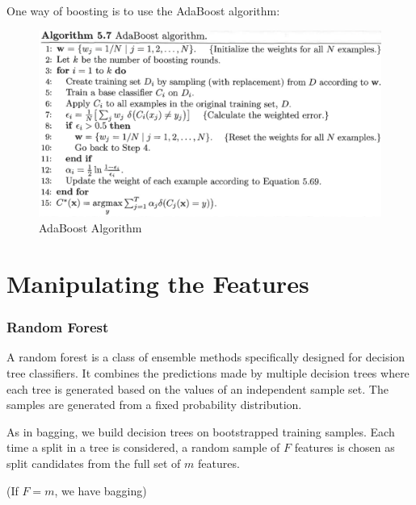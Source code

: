 One way of boosting is to use the AdaBoost algorithm:

\begin{figure}[H]
    \centering
    \includegraphics[scale=0.3]{figures/adaboost.png}
    \caption{AdaBoost Algorithm}
\end{figure}

\newpage
\section{Manipulating the Features}
\subsubsection{Random Forest}
A random forest is a class of ensemble methods specifically designed for decision tree classifiers.
It combines the predictions made by multiple decision trees where each tree is generated based on the values of an independent sample set.
The samples are generated from a fixed probability distribution.

\bigskip
As in bagging, we build decision trees on bootstrapped training samples.
Each time a split in a tree is considered, a random sample of $F$ features is chosen as split candidates from the full set of $m$ features.

(If $F=m$, we have bagging)

